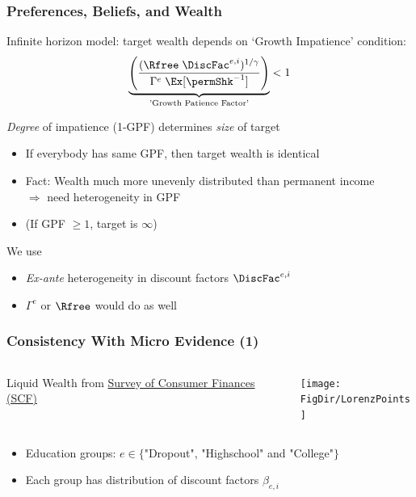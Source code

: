 \documentclass[pdflatex,aspectratio=169, handout]{beamer}
\renewcommand{\PermGroFac}{\Gamma}
\begin{document}
\begin{frame}
  \frametitle{Preferences, Beliefs, and Wealth}
  Infinite horizon model: target wealth depends on `Growth Impatience' condition:
\begin{equation}
  \underbrace{
    \left(
      \frac{(\Rfree \; \DiscFac^{e,i})^{1/\gamma}}
      {\PermGroFac^{e} \; \Ex[\permShk^{-1}]}
    \right)
    }_{\text{'Growth Patience Factor'}}
      < 1
    \end{equation}
    
  \pause 
  \emph{Degree} of impatience (1-GPF) determines \emph{size} of target
  \begin{itemize}[<+->]
	\item If everybody has same GPF, then target wealth is identical
	\item Fact: Wealth much more unevenly distributed than permanent income \\[1ex]
		 $\Rightarrow$ need heterogeneity in GPF
	\item (If GPF $\geq 1$, target is $\infty$)
  \end{itemize}

  \hypertarget{ConsistentWithMicroData}{}

  \pause
  We use
  \begin{itemize}[<+->]
  \item \textit{Ex-ante} heterogeneity in discount factors $\DiscFac^{e,i}$
  \item $\PermGroFac^{e}$ or $\Rfree$ would do as well
  \end{itemize}
  
\end{frame}

\begin{frame}
  \frametitle{Consistency With Micro Evidence (1)}
  \begin{columns}
    \begin{column}{0.3\linewidth}
      Liquid Wealth from \href{https://www.federalreserve.gov/econres/scfindex.htm}{Survey of Consumer Finances (SCF)}
	\end{column}	
	\begin{column}{0.7\linewidth}
	\texttt{[image: \\FigDir/LorenzPoints]}
    \end{column}
 \end{columns}
\medskip 
\begin{itemize}
	\item Education groups: $e\in\{$"Dropout", "Highschool" and "College"$\}$
	\item Each group has distribution of discount factors $\beta_{e,i}$
\end{itemize}	
\end{frame}
\end{document}
